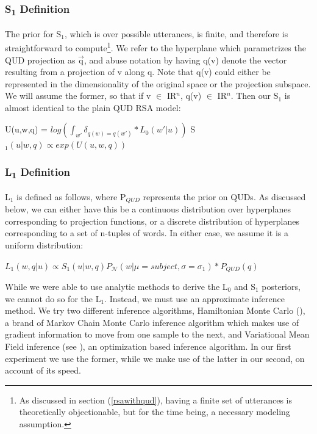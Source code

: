 \documentclass[10pt,letterpaper,twocolumn]{article}
\begin{document}
\subsubsection{S\textsubscript{1} Definition}

The prior for S$_1$, which is over possible utterances, is finite, and therefore is straightforward to compute\footnote{As discussed in section (\ref{rsawithqud}), having a finite set of utterances is theoretically objectionable, but for the time being, a necessary modeling assumption.}. We refer to the hyperplane which parametrizes the QUD projection as $\overrightarrow{\text{q}}$, and abuse notation by having q(v) denote the vector resulting from a projection of v along q. Note that q(v) could either be represented in the dimensionality of the original space or the projection subspace. We will assume the former, so that if v $\in$ {\rm I\!R}$^n$, q(v) $\in$ {\rm I\!R}$^n$. Then our S$_1$ is almost identical to the plain QUD RSA model:

\begin{exe}
\ex U(u,w,q) = $log(\int_{w'} \delta_{q(w)=q(w')} * L_0(w'\vert u))$
\ex S$_1(u\vert w,q) \propto exp(U(u,w,q))$
\end{exe}




\subsubsection{L\textsubscript{1} Definition}

L$_1$ is defined as follows, where P$_{QUD}$ represents the prior on QUDs. As discussed below, we can either have this be a continuous distribution over hyperplanes corresponding to projection functions, or a discrete distribution of hyperplanes corresponding to a set of n-tuples of words. In either case, we assume it is a uniform distribution:
\begin{exe}
\ex $L_1(w,q\vert u) \propto S_1(u\vert w,q) P_{\mathcal{N}}(w\vert\mu=subject,\sigma=\sigma_1)*P_{QUD}(q)$
\end{exe}
While we were able to use analytic methods to derive the L$_0$ and S$_1$ posteriors, we cannot do so for the L$_1$. Instead, we must use an approximate inference method. We try two different inference algorithms, Hamiltonian Monte Carlo (\cite{neal2011mcmc}), a brand of Markov Chain Monte Carlo inference algorithm which makes use of gradient information to move from one sample to the next, and Variational Mean Field inference (see \cite{blei2017variational}), an optimization based inference algorithm. In our first experiment we use the former, while we make use of the latter in our second, on account of its speed.
\end{document}
